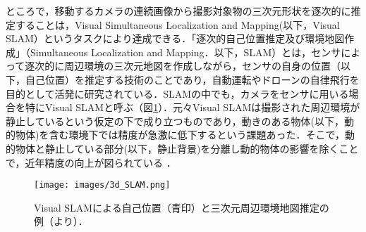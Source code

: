 ところで，移動するカメラの連続画像から撮影対象物の三次元形状を逐次的に推定することは，Visual Simultaneous Localization and Mapping(以下，Visual SLAM）というタスクにより達成できる．「逐次的自己位置推定及び環境地図作成」（Simultaneous Localization and Mapping．以下，SLAM）とは，センサによって逐次的に周辺環境の三次元地図を作成しながら，センサの自身の位置（以下，自己位置）を推定する技術のことであり\cite{tomono正裕2018slam}，自動運転やドローンの自律飛行を目的として活発に研究されている．SLAMの中でも，カメラをセンサに用いる場合を特にVisual SLAMと呼ぶ（図\ref{fig:visual slam example}）．元々Visual SLAMは撮影された周辺環境が静止しているという仮定の下で成り立つものであり，動きのある物体(以下，動的物体)を含む環境下では精度が急激に低下するという課題あった．そこで，動的物体と静止している部分(以下，静止背景)を分離し動的物体の影響を除くことで，近年精度の向上が図られている \cite{saputra2018visual}．

\begin{figure}
    \centering
    \texttt{[image: images/3d\_SLAM.png]}
    \caption[Visual SLAMによる自己位置と三次元周辺環境地図推定の例]{Visual SLAMによる自己位置（青印）と三次元周辺環境地図推定の例（\cite{mur2017orb}より）．}
    \label{fig:visual slam example}
\end{figure}

\begin{comment}
動的物体を含む環境下でのVisual SLAM（以下，動的Visual SLAM）に対しては，動的物体と静的な背景を個別に扱うことで精度を向上させる技術が近年発達した\cite{saputra2018visual}．
ここ数十年でVisual SLAMは急激な発展を遂げてきたが，ほとんどの技術は外的環境が変化しないという想定の下で成り立っているものであった．
そのため，動物体を含む環境に対しては，特徴点の誤対応やオクルージョン（注目している物体が前にある物体に遮られること）により精度が急激に落ちるという問題点があった\cite{tan2013robust}．
これを克服したのが，動的物体と静的な背景を個別に扱う方法である\cite{saputra2018visual}．
具体的には以下の手順を踏む．
\begin{enumerate}
 \item 入力された連続画像を動的物体と静的な背景に分離する．
 \item 画像における静的な背景の部分のみから特徴点を抽出し，それらを用いて従来のSLAMを行うことで，カメラ姿勢推定と静的な背景のみの環境地図の構築を行う．
 \item 上の手順で得られたカメラ姿勢と分離された動的物体の深度推定などから，動的物体の三次元復元および追跡を行う．
\end{enumerate}
しかし，動的Visual SLAMにおける動的物体自体の形状や変位の把握は依然としてチャレンジングな課題である．
動的Visual SLAMに関する研究の多くは，カメラの自己位置推定および静的な背景の復元に重きを置いてきた．
動的物体の部分については，動的物体が直線や円錐曲線上を動くと仮定して追跡する\cite{alcantarilla2012combining,avidan1999trajectory}など，動きに対して何かしらの仮定が設けられていることが多い．
深層学習ベースの単眼深度推定を用いた動的物体の形状復元も手法として考えられるが，こちらは学習していない物体に対しては十分な精度が得られないという問題がある．
そのため，動的物体の複雑な動きを捉えることや，高精度な位置推定・微小な変位推定を行おうとしたVisual SLAMの研究は少ない．
\end{comment}

